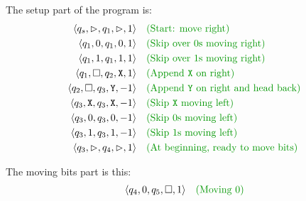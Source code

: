 \documentclass[12pt]{extarticle}
\begin{document}
The setup part of the program is:
\begin{align*}
\langle q_s, \vartriangleright, q_1, \vartriangleright, 1 \rangle &&& \expl{Start: move right}\\
\langle q_1, 0, q_1, 0, 1 \rangle &&& \expl{Skip over 0s moving right}\\
\langle q_1, 1, q_1, 1, 1 \rangle &&& \expl{Skip over 1s moving right}\\
\langle q_1, \square, q_2, \texttt{X}, 1\rangle &&& \expl{Append \texttt{X} on right} \\
\langle q_2, \square, q_3, \texttt{Y}, -1 \rangle &&& \expl{Append \texttt{Y} on right and head back}\\
\langle q_3, \texttt{X}, q_3, \texttt{X}, -1 \rangle &&& \expl{Skip \texttt{X} moving left}\\
\langle q_3, 0, q_3, 0, -1 \rangle &&& \expl{Skip 0s moving left}\\
\langle q_3, 1, q_3, 1, -1 \rangle &&& \expl{Skip 1s moving left}\\
\langle q_3, \vartriangleright, q_4, \vartriangleright, 1 \rangle &&& \expl{At beginning, ready to move bits}\\
\end{align*}

The moving bits part is this:
\begin{align*}
\langle q_4, 0, q_5, \square, 1 \rangle &&& \expl{Moving 0}\\
\end{align*}


\end{document}
